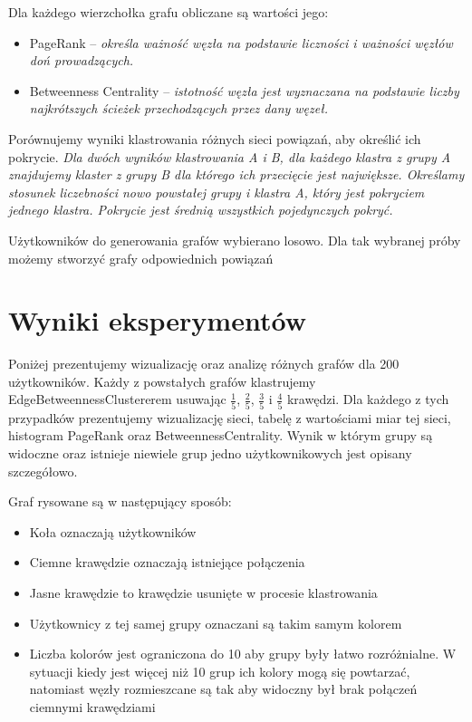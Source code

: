 \documentclass[10pt,a4paper]{article}
\begin{document}
Dla każdego wierzchołka grafu obliczane są wartości jego:
\begin{itemize}
\item PageRank – {\itshape określa ważność węzła na podstawie liczności i ważności węzłów doń prowadzących.}
\item Betweenness Centrality – {\itshape istotność węzła jest wyznaczana na podstawie liczby najkrótszych ścieżek przechodzących przez dany węzeł.}
\end{itemize}

Porównujemy wyniki klastrowania różnych sieci powiązań, aby określić ich pokrycie. 
{\itshape Dla dwóch wyników klastrowania A i B, dla każdego klastra z grupy A znajdujemy klaster z grupy B dla którego ich przecięcie jest największe. Określamy stosunek liczebności nowo powstałej grupy i klastra A, który jest pokryciem jednego klastra. Pokrycie jest średnią wszystkich pojedynczych pokryć.}

	Użytkowników do generowania grafów wybierano losowo. Dla tak wybranej próby możemy stworzyć grafy odpowiednich powiązań


\section{Wyniki eksperymentów}

	Poniżej prezentujemy wizualizację oraz analizę różnych grafów dla 200 użytkowników. Każdy z powstałych grafów klastrujemy EdgeBetweennessClustererem usuwając $\frac{1}{5}$, $\frac{2}{5}$, $\frac{3}{5}$ i $\frac{4}{5}$   krawędzi. Dla każdego z tych przypadków prezentujemy wizualizację sieci, tabelę z wartościami miar tej sieci, histogram PageRank oraz BetweennessCentrality. Wynik w którym grupy są widoczne oraz istnieje niewiele grup jedno użytkownikowych jest opisany szczegółowo.


Graf rysowane są w następujący sposób:
\begin{itemize}
	\item Koła oznaczają użytkowników
	\item Ciemne krawędzie oznaczają istniejące połączenia
	\item Jasne krawędzie to krawędzie usunięte w procesie klastrowania
	\item Użytkownicy z tej samej grupy oznaczani są takim samym kolorem
	\item Liczba kolorów jest ograniczona do 10 aby grupy były łatwo rozróżnialne. W sytuacji kiedy jest więcej niż 10 grup ich kolory mogą się powtarzać, natomiast węzły rozmieszcane są tak aby widoczny był brak połączeń ciemnymi krawędziami
\end{itemize} 
\end{document}

